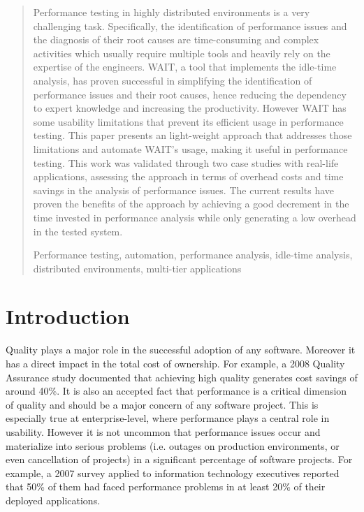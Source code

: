 \documentclass[runningheads,a4paper]{llncs}
\newcommand{\keywords}[1]{\par\addvspace\baselineskip
\noindent\keywordname\enspace\ignorespaces#1}
\begin{document}
\vspace{-10pt}
\begin{abstract}
Performance testing in highly distributed environments is a very challenging
task. Specifically, the identification of performance issues and
the diagnosis of their root causes are time-consuming and complex
activities which usually require multiple tools and heavily rely on the
expertise of the engineers. WAIT, a tool that implements the idle-time analysis,
has proven successful in simplifying the identification of performance issues
and their root causes, hence reducing the dependency to expert knowledge and 
increasing the productivity. However WAIT has some usability limitations that
prevent its efficient usage in performance testing. This paper presents an 
light-weight approach that addresses those limitations and automate WAIT's
usage, making it useful in performance testing. This work was validated through
two case studies with real-life applications, assessing the approach in terms of
overhead costs and time savings in the analysis of performance issues.
The current results have proven the benefits of the approach by achieving a good
decrement in the time invested in performance analysis while only generating a low 
overhead in the tested system.
\keywords{Performance testing, automation, performance analysis, idle-time
analysis, distributed environments, multi-tier applications}
\end{abstract}
\vspace{-22pt}

\section{Introduction}

\vspace{-5pt}
Quality plays a major role in the successful adoption of any software.
Moreover it has a direct impact in the total cost of ownership. For
example, a 2008 Quality Assurance study \cite{CapersJones1} documented that achieving high
quality generates cost savings of around 40\%. It is also an accepted fact that
performance is a critical dimension of quality and should be a major concern of
any software project. This is especially true at enterprise-level, where
performance plays a central role in usability. However it is not uncommon that
performance issues occur and materialize into serious problems (i.e. outages on
production environments, or even cancellation of projects) in a significant
percentage of software projects. For example, a 2007 survey applied to
information technology executives \cite{Compuware1} reported that 50\% of them
had faced performance problems in at least 20\% of their deployed applications.
\end{document}
